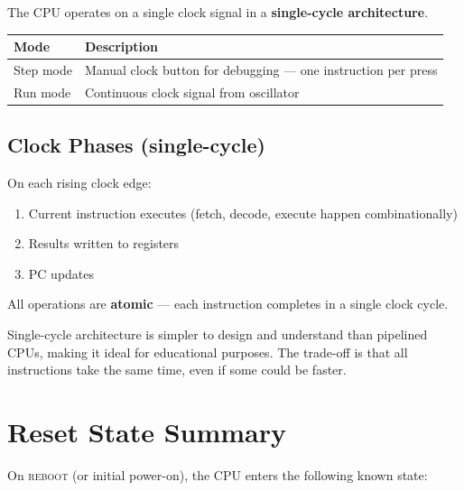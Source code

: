 \documentclass[11pt,a4paper]{article}
\newcommand{\signal}[1]{\textsc{#1}}
\begin{document}
The CPU operates on a single clock signal in a \textbf{single-cycle architecture}.

\begin{table}[H]
\centering
\begin{tabularx}{\textwidth}{@{}lX@{}}
\toprule
\textbf{Mode} & \textbf{Description} \\
\midrule
Step mode & Manual clock button for debugging --- one instruction per press \\
Run mode  & Continuous clock signal from oscillator \\
\bottomrule
\end{tabularx}
\end{table}

\subsection{Clock Phases (single-cycle)}

On each rising clock edge:
\begin{enumerate}[nosep]
  \item Current instruction executes (fetch, decode, execute happen combinationally)
  \item Results written to registers
  \item PC updates
\end{enumerate}

All operations are \textbf{atomic} --- each instruction completes in a single clock cycle.

\begin{designnote}
Single-cycle architecture is simpler to design and understand than pipelined CPUs, making it ideal for educational purposes. The trade-off is that all instructions take the same time, even if some could be faster.
\end{designnote}

\section{Reset State Summary}

On \signal{reboot} (or initial power-on), the CPU enters the following known state:
\end{document}
